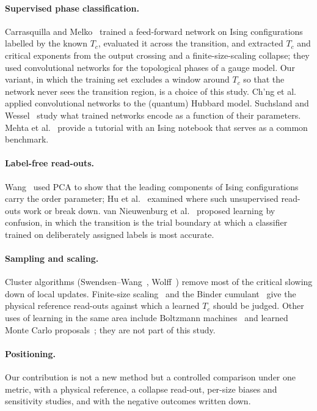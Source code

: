 \paragraph*{Supervised phase classification.} Carrasquilla and Melko~\cite{carrasquilla2016machine} trained a feed-forward network on Ising configurations labelled by the known $T_c$, evaluated it across the transition, and extracted $T_c$ and critical exponents from the output crossing and a finite-size-scaling collapse; they used convolutional networks for the topological phases of a gauge model. Our variant, in which the training set excludes a window around $T_c$ so that the network never sees the transition region, is a choice of this study. Ch'ng et al.~\cite{chng2016machine} applied convolutional networks to the (quantum) Hubbard model. Suchsland and Wessel~\cite{suchsland2018parameter} study what trained networks encode as a function of their parameters. Mehta et al.~\cite{mehta2018high} provide a tutorial with an Ising notebook that serves as a common benchmark.

\paragraph*{Label-free read-outs.} Wang~\cite{wang2016discovering} used PCA to show that the leading components of Ising configurations carry the order parameter; Hu et al.~\cite{hu2017discovering} examined where such unsupervised read-outs work or break down. van Nieuwenburg et al.~\cite{nieuwenburg2016learning} proposed learning by confusion, in which the transition is the trial boundary at which a classifier trained on deliberately assigned labels is most accurate.

\paragraph*{Sampling and scaling.} Cluster algorithms (Swendsen--Wang~\cite{swendsen1987nonuniversal}, Wolff~\cite{wolff1989collective}) remove most of the critical slowing down of local updates. Finite-size scaling~\cite{fisher1972scaling} and the Binder cumulant~\cite{binder1981finite} give the physical reference read-outs against which a learned $T_c$ should be judged. Other uses of learning in the same area include Boltzmann machines~\cite{torlai2016learning} and learned Monte Carlo proposals~\cite{liu2016self}; they are not part of this study.

\paragraph*{Positioning.} Our contribution is not a new method but a controlled comparison under one metric, with a physical reference, a collapse read-out, per-size biases and sensitivity studies, and with the negative outcomes written down.
